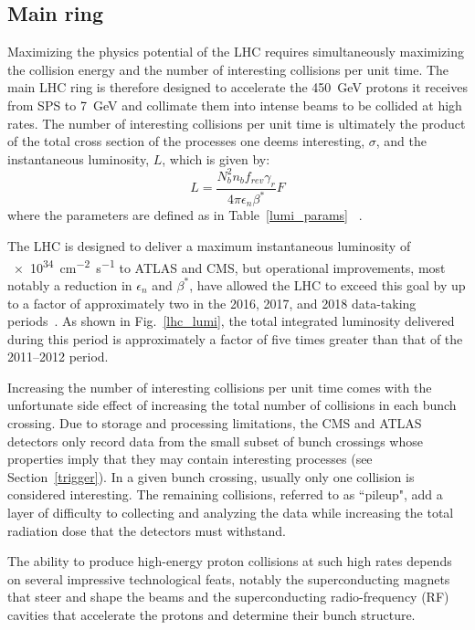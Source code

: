 

\subsection{Main ring}
Maximizing the physics potential of the LHC requires simultaneously maximizing the collision energy and the number of interesting collisions per unit time. The main LHC ring is therefore designed to accelerate the \SI{450}{\GeV} protons it receives from SPS to \SI{7}{\GeV} and collimate them into intense beams to be collided at high rates. The number of interesting collisions per unit time is ultimately the product of the total cross section of the processes one deems interesting, $\sigma$, and the instantaneous luminosity, $L$, which is given by:
\begin{equation}
\label{lumi_eq}
L = \frac{N_{b}^{2} n_{b} f_{rev} \gamma_{r}}{4 \pi \epsilon_{n} \beta^{*}}F
\end{equation}
where the parameters are defined as in Table~\ref{lumi_params} ~\cite{lhc_machine}.



The LHC is designed to deliver a maximum instantaneous luminosity of \linebreak[4] \SI{e34}{\cm\tothe{-2}\s\tothe{-1}} to ATLAS and CMS, but operational improvements, most notably a reduction in $\epsilon_{n}$ and $\beta^{*}$, have allowed the LHC to exceed this goal by up to a factor of approximately two in the 2016, 2017, and 2018 data-taking periods~\cite{lhc_run2_operation}. As shown in Fig.~\ref{lhc_lumi}, the total integrated luminosity delivered during this period is approximately a factor of five times greater than that of the 2011--2012 period.

Increasing the number of interesting collisions per unit time comes with the unfortunate side effect of increasing the total number of collisions in each bunch crossing. Due to storage and processing limitations, the CMS and ATLAS detectors only record data from the small subset of bunch crossings whose properties imply that they may contain interesting processes (see Section~\ref{trigger}). In a given bunch crossing, usually only one collision is considered interesting. The remaining collisions, referred to as ``pileup", add a layer of difficulty to collecting and analyzing the data while increasing the total radiation dose that the detectors must withstand.

The ability to produce high-energy proton collisions at such high rates depends on several impressive technological feats, notably the superconducting magnets that steer and shape the beams and the superconducting radio-frequency (RF) cavities that accelerate the protons and determine their bunch structure.

